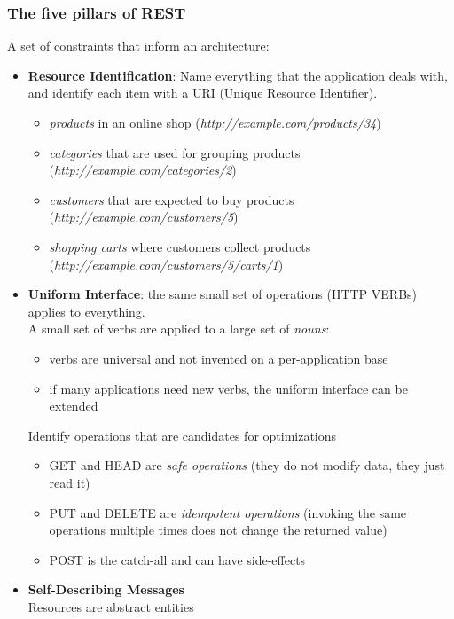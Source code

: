 \documentclass[10pt,a4paper]{article}
\begin{document}
\subsubsection{The five pillars of REST}
 A set of constraints that inform an architecture:
 \begin{itemize}
 	\item \textbf{Resource Identification}: Name everything that the application deals with, and identify each item with a URI (Unique Resource Identifier).
 	\begin{itemize}
 		\item \textit{products} in an online shop (\textit{http://example.com/products/34})
 		\item \textit{categories} that are used for grouping products (\textit{http://example.com/categories/2})
 		\item \textit{customers} that are expected to buy products (\textit{http://example.com/customers/5})
 		\item \textit{shopping carts} where customers collect products (\textit{http://example.com/customers/5/carts/1})
 	\end{itemize}
 	\item \textbf{Uniform Interface}: the same small set of operations (HTTP VERBs) applies to everything. \\ A small set of verbs are applied to a large set of \textit{nouns}:
 	\begin{itemize}
 		\item verbs are universal and not invented on a per-application base
 		\item if many applications need new verbs, the uniform interface can be extended
 	\end{itemize}
 	Identify operations that are candidates for optimizations
 	\begin{itemize}
 		\item GET and HEAD are \textit{safe operations} (they do not modify data, they just read it)
 		\item PUT and DELETE are \textit{idempotent operations} (invoking the same operations multiple times does not change the returned value)
 		\item POST is the catch-all and can have side-effects
 	\end{itemize}
 	\item \textbf{Self-Describing Messages} \\
 	Resources are abstract entities
 	\begin{itemize}

\end{itemize}
\end{itemize}
\end{document}
